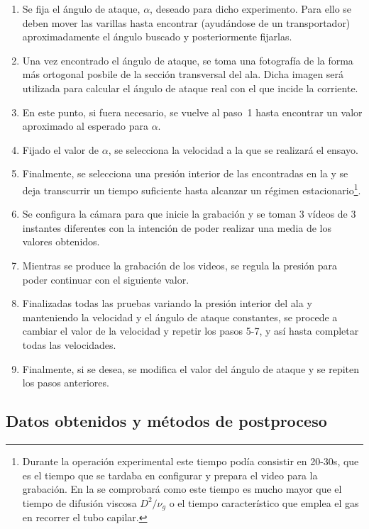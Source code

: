 \begin{enumerate}
\item Se fija el ángulo de ataque, $\alpha$, deseado para dicho experimento. Para ello se deben mover las varillas hasta encontrar (ayudándose de un transportador) aproximadamente el ángulo buscado y posteriormente fijarlas.
\item Una vez encontrado el ángulo de ataque, se toma una fotografía de la forma más ortogonal posbile de la sección transversal del ala. Dicha imagen será utilizada para calcular el ángulo de ataque real con el que incide la corriente.
\item En este punto, si fuera necesario, se vuelve al paso~1 hasta encontrar un valor aproximado al esperado para $\alpha$.
\item Fijado el valor de $\alpha$, se selecciona la velocidad a la que se realizará el ensayo.
\item Finalmente, se selecciona una presión interior de las encontradas en la  y se deja transcurrir un tiempo suficiente hasta alcanzar un régimen estacionario\footnote{Durante la operación experimental este tiempo podía consistir en 20-30s, que es el tiempo que se tardaba en configurar y prepara el video para la grabación. En la  se comprobará como este tiempo es mucho mayor que el tiempo de difusión viscosa $D^{2}/\nu_{g}$ o el tiempo característico que emplea el gas en recorrer el tubo capilar.}.
\item Se configura la cámara para que inicie la grabación y se toman 3 vídeos de 3 instantes diferentes con la intención de poder realizar una media de los valores obtenidos.
\item Mientras se produce la grabación de los videos, se regula la presión para poder continuar con el siguiente valor.
\item Finalizadas todas las pruebas variando la presión interior del ala y manteniendo la velocidad y el ángulo de ataque constantes, se  procede a cambiar el valor de la velocidad y repetir los pasos 5-7, y así hasta completar todas las velocidades. 
\item Finalmente, si se desea, se modifica el valor del ángulo de ataque y se repiten los pasos anteriores.

\end{enumerate}


\subsection{Datos obtenidos y métodos de postproceso}

